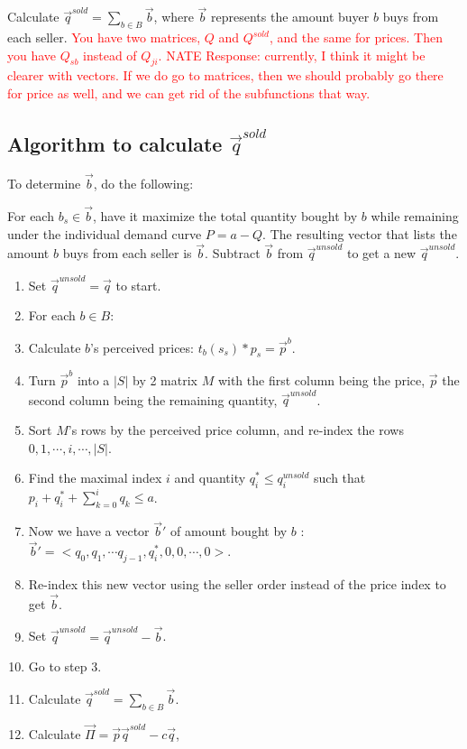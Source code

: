 \documentclass[11pt]{article}
\newcommand{\red}[1]{\textcolor{red}{#1}} %
\begin{document}
Calculate $\vec{q}^{sold} = \sum _{b\in B} \vec{b}$, where $\vec{b}$ represents
the amount buyer $b$ buys from each seller. 
\red{You have two matrices, $Q$ and $Q^{sold}$, and the same for prices. Then
you have $Q_{sb}$ instead of $Q_{ji}$. NATE Response: currently, I think it
might be clearer with vectors.  If we do go to matrices, then we should probably
go there for price as well, and we can get rid of the subfunctions that way.}


\subsection{Algorithm to calculate $\vec{q}^{sold}$}

To determine $\vec{b}$, do the following:

For each $b_s \in \vec{b}$, have it maximize the total quantity bought by $b$
while remaining under the individual demand curve $P=a-Q$.  The resulting vector
that lists the amount $b$ buys from each seller is $\vec{b}$.  Subtract
$\vec{b}$ from $\vec{q}^{unsold}$ to get a new $\vec{q}^{unsold}$.


\begin{enumerate}
    \item Set $\vec{q}^{unsold} = \vec{q}$ to start.
    \item For each $b\in B$:
	\item Calculate $b$'s perceived prices: $t_b(s_s) * p_s = \vec{p}^b$.  
    \item Turn $\vec{p}^b$ into a $|S|$ by 2 matrix $M$ with the first column
        being the price, $\vec{p}$ the second column being the remaining
        quantity, $\vec{q}^{unsold}$. 
    \item Sort $M$'s rows by the perceived price column, and re-index the
        rows $0, 1, \cdots , i, \cdots , |S|$. 
    \item Find the maximal index $i$ and quantity $q^{*}_i \le q^{unsold}_i$
        such that $p_i + q^{*}_i + \sum_{k=0}^i q_k \le a$. 
    \item Now we have a vector $\vec{b}'$ of amount bought by $b$ : $\vec{b}' =
        <q_0, q_1,\cdots q_{j-1}, q^{*}_i, 0, 0, \cdots, 0>.$
    \item Re-index this new vector using the seller order instead of the price
        index to get $\vec{b}$.
    \item Set $\vec{q}^{unsold} = \vec{q}^{unsold}-\vec{b}$.
    \item Go to step 3.
    \item Calculate $\vec{q}^{sold} = \sum _{b\in B} \vec{b}$.
    \item Calculate $\vec{\Pi} = \vec{p}\vec{q}^{sold} - c\vec{q}$, 
\end{enumerate}
\end{document}
